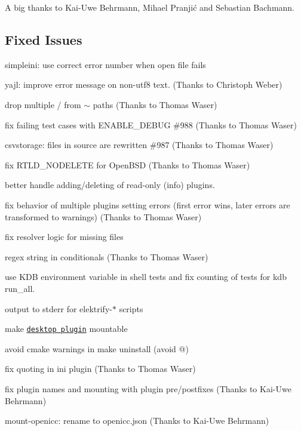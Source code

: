 A big thanks to Kai-\/\+Uwe Behrmann, Mihael Pranjić and Sebastian Bachmann.

\subsection*{Fixed Issues}


\begin{DoxyItemize}
\item simpleini\+: use correct error number when open file fails
\item yajl\+: improve error message on non-\/utf8 text. (Thanks to Christoph Weber)
\item drop multiple {\ttfamily /} from {\ttfamily $\sim$} paths (Thanks to Thomas Waser)
\item fix failing test cases with {\ttfamily E\+N\+A\+B\+L\+E\+\_\+\+D\+E\+B\+UG} \#988 (Thanks to Thomas Waser)
\item csvstorage\+: files in source are rewritten \#987 (Thanks to Thomas Waser)
\item fix R\+T\+L\+D\+\_\+\+N\+O\+D\+E\+L\+E\+TE for Open\+B\+SD (Thanks to Thomas Waser)
\item better handle adding/deleting of read-\/only (info) plugins.
\item fix behavior of multiple plugins setting errors (first error wins, later errors are transformed to warnings) (Thanks to Thomas Waser)
\item fix resolver logic for missing files
\item regex string in conditionals (Thanks to Thomas Waser)
\item use {\ttfamily K\+DB} environment variable in shell tests and fix counting of tests for {\ttfamily kdb run\+\_\+all}.
\item output to {\ttfamily stderr} for {\ttfamily elektrify-\/$\ast$} scripts
\item make \href{https://master.libelektra.org/src/plugins/desktop}{\tt desktop plugin} mountable
\item avoid cmake warnings in {\ttfamily make uninstall} (avoid {\ttfamily @})
\item fix quoting in ini plugin (Thanks to Thomas Waser)
\item fix plugin names and mounting with plugin pre/postfixes (Thanks to Kai-\/\+Uwe Behrmann)
\item mount-\/openicc\+: rename to openicc.\+json (Thanks to Kai-\/\+Uwe Behrmann)
\end{DoxyItemize}

